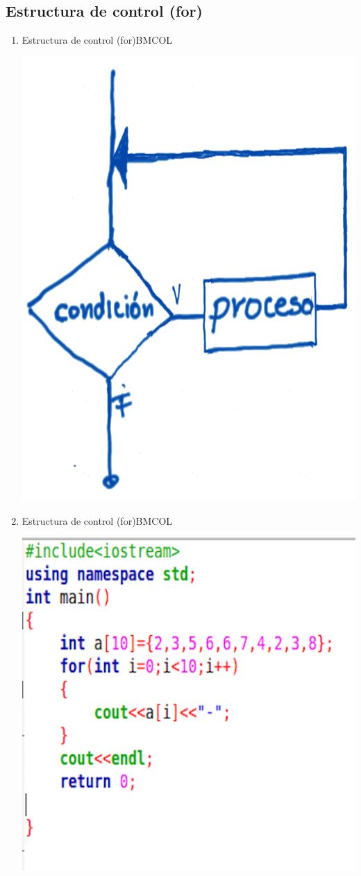 \documentclass[presentation, aspectratio=54]{beamer}
\begin{document}
\subsection{Estructura de control (for)}
\label{sec:orgeb7a31b}
\begin{enumerate}
\item Estructura de control (for)\hfill{}\textsc{BMCOL}
\label{sec:org56198b4}
\begin{center}
\includegraphics[width=.9\linewidth]{./images/codigo/for.png}
\end{center}
\item Estructura de control (for)\hfill{}\textsc{BMCOL}
\label{sec:orga1d3043}
\begin{center}
\includegraphics[width=.9\linewidth]{./images/codigo/code-for.png}

\end{center}
\end{enumerate}
\end{document}
